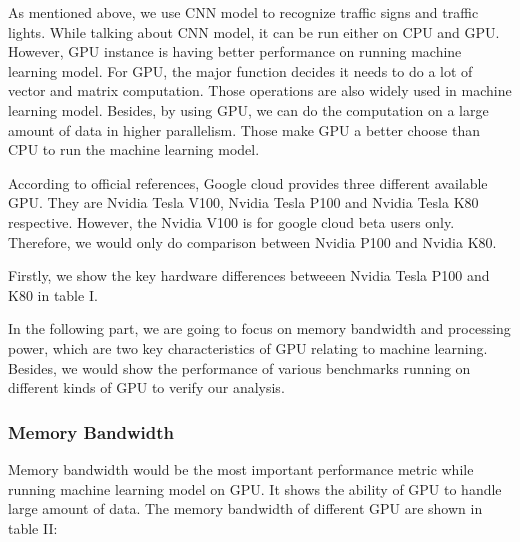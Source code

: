 \documentclass[conference]{IEEEtran}
\begin{document}
As mentioned above, we use CNN model to recognize traffic signs and traffic lights. While talking about CNN model, it can be run either on CPU and GPU. However, GPU instance is having better performance on running machine learning model. For GPU, the major function decides it needs to do a lot of vector and matrix computation. Those operations are also widely used in machine learning model. Besides, by using GPU, we can do the computation on a large amount of data in higher parallelism. Those make GPU a better choose than CPU to run the machine learning model.   

According to official references, Google cloud provides three different available GPU. They are Nvidia Tesla V100, Nvidia Tesla P100 and Nvidia Tesla K80 respective. However, the Nvidia V100 is for google cloud beta users only. Therefore, we would only do comparison between Nvidia P100 and Nvidia K80.




Firstly, we show the key hardware differences betweeen Nvidia Tesla P100 and K80 in table I.

In the following part, we are going to focus on memory bandwidth and processing power, which are two key characteristics of GPU relating to machine learning. Besides, we would show the performance of various benchmarks running on different kinds of GPU to verify our analysis. 

\subsubsection{Memory Bandwidth}
Memory bandwidth would be the most important performance metric while running machine learning model on GPU. It shows the ability of GPU to handle large amount of data. The memory bandwidth of different GPU are shown in table II:
\end{document}
